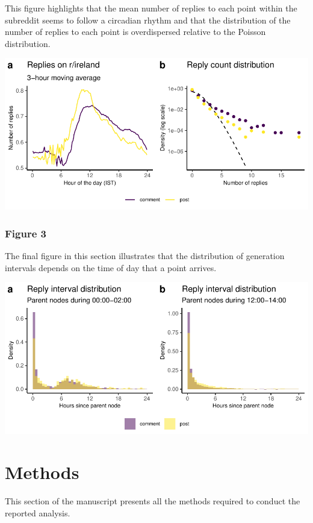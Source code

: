 \documentclass[
]{article}
\begin{document}
This figure highlights that the mean number of replies to each point
within the subreddit seems to follow a circadian rhythm and that the
distribution of the number of replies to each point is overdispersed
relative to the Poisson distribution.

\includegraphics{figures_and_tables_files/figure-latex/reply_distribution_exploration-1.pdf}

\hypertarget{figure-3}{%
\subsubsection{Figure 3}\label{figure-3}}

The final figure in this section illustrates that the distribution of
generation intervals depends on the time of day that a point arrives.

\includegraphics{figures_and_tables_files/figure-latex/reply_interval_exploration-1.pdf}

\hypertarget{methods}{%
\section{Methods}\label{methods}}

This section of the manuscript presents all the methods required to
conduct the reported analysis.
\end{document}
